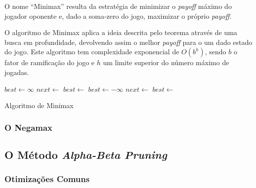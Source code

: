 \documentclass[12pt,a4paper,oneside]{article}
\begin{document}
O nome ``Minimax'' resulta da estratégia de minimizar o \emph{payoff} máximo do jogador oponente e, dado a soma-zero do jogo, maximizar o próprio \emph{payoff}.

O algoritmo de Minimax aplica a ideia descrita pelo teorema através de uma busca em profundidade, devolvendo assim o melhor \emph{payoff} para o um dado estado do jogo. Este algoritmo tem complexidade exponencial de $O(b^{h})$, sendo $b$ o fator de ramificação do jogo e $h$ um limite superior do número máximo de jogadas.

\begin{algorithm}
\begin{algorithmic}
 
   
  \EndIf
      \State $best \gets \infty$
          \State $next \gets$ 
          \State $best \gets$ 
      \EndFor
      \State $best \gets -\infty$
          \State $next \gets$ 
          \State $best \gets$ 
      \EndFor
  \EndIf
  \State{} 
\EndFunction
\end{algorithmic}
\caption{Algoritmo de Minimax}
\end{algorithm}



\subsubsection{O Negamax}

\lipsum[1]

\lipsum[2]

\subsection{O Método \textit{Alpha-Beta Pruning}}

\lipsum[1]

\lipsum[2]

\lipsum[3]

\lipsum[4]

\lipsum[5]

\lipsum[6]

\subsubsection{Otimizações Comuns}
\end{document}
